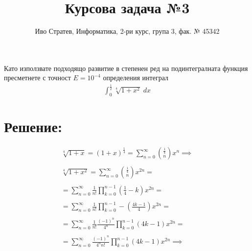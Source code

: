 \documentclass[a4paper,14pt]{extarticle}
\title{Курсова задача №3}
\author{Иво Стратев, Информатика, 2-ри курс, група 3, фак. № 45342}
\begin{document}
\maketitle

Като използвате подходящо развитие в степенен ред на подинтегралната функция пресметнете с
точност $E = 10^{-4}$ определения интеграл 
\begin{align*}
\displaystyle\int_0^{\frac{1}{2}} \sqrt[4]{1 + x^2} \; dx
\end{align*}

\section*{Решение:}

\begin{align*}
    \sqrt[4]{1 + x} = (1 + x)^{\frac{1}{4}}
    = \displaystyle\sum_{n = 0}^{\infty} \binom{\frac{1}{4}}{n}x^n \implies \\\\
    \sqrt[4]{1 + x^2} = \displaystyle\sum_{n = 0}^{\infty} \binom{\frac{1}{4}}{n}x^{2n} = \\\\
    = \displaystyle\sum_{n = 0}^{\infty} \frac{1}{n!}\displaystyle\prod_{k = 0}^{n - 1}\left(\frac{1}{4} - k\right) x^{2n} = \\\\
    = \displaystyle\sum_{n = 0}^{\infty} \frac{1}{n!}\displaystyle\prod_{k = 0}^{n - 1}-\left(\frac{4k - 1}{4}\right) x^{2n} = \\\\
    = \displaystyle\sum_{n = 0}^{\infty} \frac{1}{n!}\frac{(-1)^{n}}{4^n}\displaystyle\prod_{k = 0}^{n - 1}(4k - 1) x^{2n} = \\\\
    = \displaystyle\sum_{n = 0}^{\infty} \frac{(-1)^{n}}{4^n n!}\displaystyle\prod_{k = 0}^{n - 1}(4k - 1)x^{2n} \implies
\end{align*}
\end{document}
